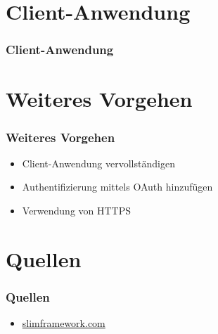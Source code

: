 \section{Client-Anwendung}
\begin{frame}
	\frametitle*{Client-Anwendung}

\end{frame}

\section{Weiteres Vorgehen}
\begin{frame}
	\frametitle*{Weiteres Vorgehen}
	\begin{itemize}
		\item Client-Anwendung vervollständigen
		\item Authentifizierung mittels OAuth hinzufügen
		\item Verwendung von HTTPS
	\end{itemize}
\end{frame}

\section{Quellen}
\begin{frame}
	\frametitle*{Quellen}
	\begin{itemize}
		\item \url{slimframework.com}
	\end{itemize}
\end{frame}
